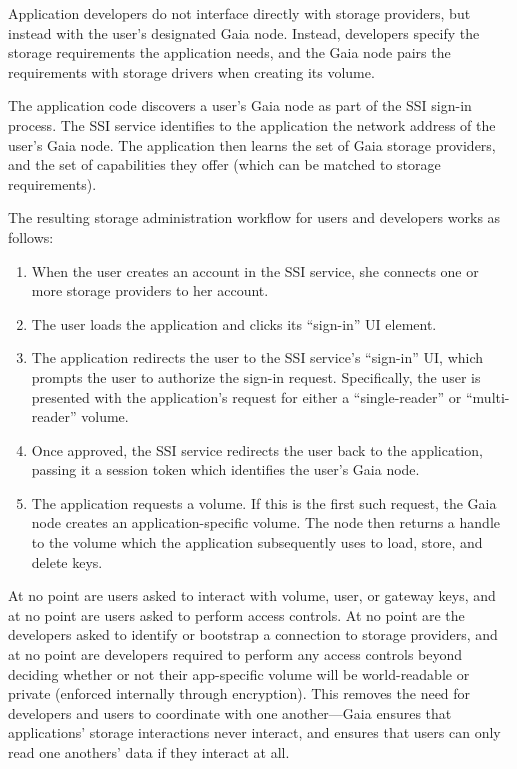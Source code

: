 Application developers do not interface directly with storage providers, but
instead with the user's designated Gaia node.
Instead, developers specify the storage requirements the
application needs, and the Gaia node pairs the requirements with storage drivers
when creating its volume.


The application code discovers a user's Gaia node as part of the SSI sign-in
process.  The SSI service identifies to the application the network address
of the user's Gaia node.  The application then learns the set of Gaia storage
providers, and the set of capabilities they offer (which can be matched to
storage requirements).

The resulting storage administration workflow for users and developers works as
follows:

\begin{enumerate}
   \item When the user creates an account in the SSI service, she connects one
      or more storage providers to her account.
   \item The user loads the application and clicks its ``sign-in'' UI element.
   \item The application redirects the user to the SSI service's ``sign-in'' UI,
      which prompts the user to authorize the sign-in request.  Specifically,
      the user is presented with the application's request for either a
      ``single-reader'' or ``multi-reader'' volume.
   \item Once approved, the SSI service redirects the user back to the
      application, passing it a session token which identifies the user's Gaia
      node.
   \item The application requests a volume.  If this is the first such request,
      the Gaia node creates an application-specific volume.  The node then
      returns a handle to the volume which the application subsequently uses to
      load, store, and delete keys.
\end{enumerate}

At no point are users asked to interact with volume, user, or gateway keys, and at no point
are users asked to perform access controls.  At no point are the developers
asked to identify or bootstrap a connection to storage providers, and at no
point are developers required to perform any access controls beyond deciding
whether or not their app-specific volume will be world-readable or private
(enforced internally through encryption).  This removes the need for developers
and users to coordinate with one another---Gaia ensures that applications' storage
interactions never interact, and ensures that users can only read one anothers'
data if they interact at all.

